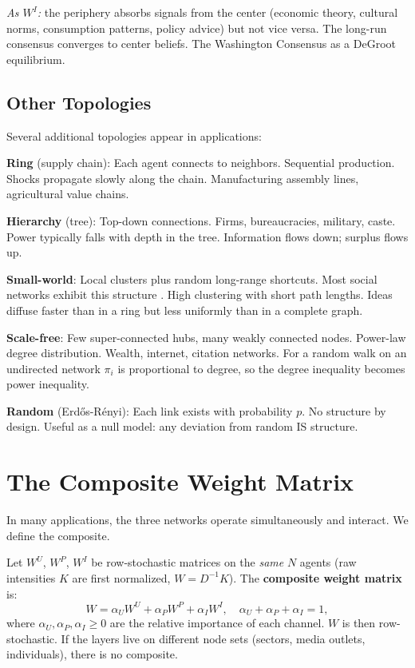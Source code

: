 \documentclass[../structural_economics_book.tex]{subfiles}
\begin{document}
\textit{As $W^I$:} the periphery absorbs signals from the center (economic theory, cultural norms, consumption patterns, policy advice) but not vice versa. The long-run consensus converges to center beliefs. The Washington Consensus as a DeGroot equilibrium.


\subsection{Other Topologies}

Several additional topologies appear in applications:

\textbf{Ring} (supply chain): Each agent connects to neighbors. Sequential production. Shocks propagate slowly along the chain. Manufacturing assembly lines, agricultural value chains.

\textbf{Hierarchy} (tree): Top-down connections. Firms, bureaucracies, military, caste. Power typically falls with depth in the tree. Information flows down; surplus flows up.

\textbf{Small-world}: Local clusters plus random long-range shortcuts. Most social networks exhibit this structure \citep{watts1998collective}. High clustering with short path lengths. Ideas diffuse faster than in a ring but less uniformly than in a complete graph.

\textbf{Scale-free}: Few super-connected hubs, many weakly connected nodes. Power-law degree distribution. Wealth, internet, citation networks. For a random walk on an undirected network $\pi_i$ is proportional to degree, so the degree inequality becomes power inequality.

\textbf{Random} (Erd\H{o}s-R\'{e}nyi): Each link exists with probability $p$. No structure by design. Useful as a null model: any deviation from random IS structure.


\section{The Composite Weight Matrix}
\label{ch05:sec:composite}

In many applications, the three networks operate simultaneously and interact. We define the composite.

\begin{definition}\label{ch05:def:composite}
Let $W^U$, $W^P$, $W^I$ be row-stochastic matrices on the \emph{same} $N$ agents (raw intensities $K$ are first normalized, $W = D^{-1}K$). The \textbf{composite weight matrix} is:
\begin{equation}\label{ch05:eq:composite}
W = \alpha_U W^U + \alpha_P W^P + \alpha_I W^I, \quad \alpha_U + \alpha_P + \alpha_I = 1,
\end{equation}
where $\alpha_U, \alpha_P, \alpha_I \geq 0$ are the relative importance of each channel. $W$ is then row-stochastic. If the layers live on different node sets (sectors, media outlets, individuals), there is no composite.
\end{definition}
\end{document}
